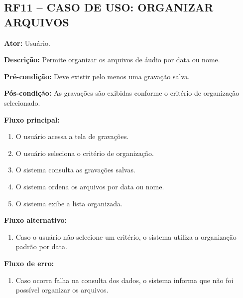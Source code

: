 \documentclass[12pt,oneside,a4paper,brazil,final]{abntex2}
\begin{document}
\clearpage
\subsection*{RF11 -- CASO DE USO: ORGANIZAR ARQUIVOS}



\textbf{Ator:} Usuário.



\textbf{Descrição:} Permite organizar os arquivos de áudio por data ou nome.



\textbf{Pré-condição:} Deve existir pelo menos uma gravação salva.



\textbf{Pós-condição:} As gravações são exibidas conforme o critério de organização selecionado.



\textbf{Fluxo principal:}

\begin{enumerate}

    \item O usuário acessa a tela de gravações.

    \item O usuário seleciona o critério de organização.

    \item O sistema consulta as gravações salvas.

    \item O sistema ordena os arquivos por data ou nome.

    \item O sistema exibe a lista organizada.

\end{enumerate}



\textbf{Fluxo alternativo:}

\begin{enumerate}

    \item Caso o usuário não selecione um critério, o sistema utiliza a organização padrão por data.

\end{enumerate}



\textbf{Fluxo de erro:}

\begin{enumerate}

    \item Caso ocorra falha na consulta dos dados, o sistema informa que não foi possível organizar os arquivos.

\end{enumerate}
\end{document}
